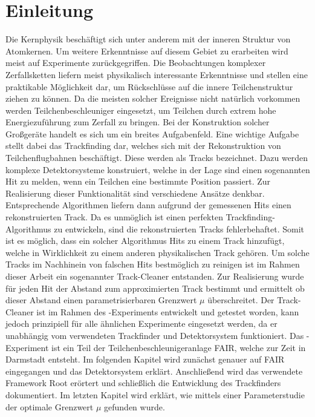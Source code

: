 \chapter{Einleitung}
Die Kernphysik beschäftigt sich unter anderem mit der inneren Struktur von Atomkernen. Um weitere Erkenntnisse auf diesem Gebiet zu erarbeiten wird meist auf Experimente zurückgegriffen. Die Beobachtungen komplexer Zerfallsketten liefern meist physikalisch interessante Erkenntnisse und stellen eine praktikable Möglichkeit dar, um Rückschlüsse auf die innere Teilchenstruktur ziehen zu können. Da die meisten solcher Ereignisse nicht natürlich vorkommen werden Teilchenbeschleuniger eingesetzt, um Teilchen durch extrem hohe Energiezuführung zum Zerfall zu bringen. Bei der Konstruktion solcher Großgeräte handelt es sich um ein breites Aufgabenfeld. Eine wichtige Aufgabe stellt dabei das Trackfinding dar, welches sich mit der Rekonstruktion von Teilchenflugbahnen beschäftigt. Diese werden als Tracks bezeichnet. Dazu werden komplexe Detektorsysteme konstruiert, welche in der Lage sind einen sogenannten Hit zu melden, wenn ein Teilchen eine bestimmte Position passiert. Zur Realisierung dieser Funktionalität sind verschiedene Ansätze denkbar. Entsprechende Algorithmen liefern dann aufgrund der gemessenen Hits einen rekonstruierten Track. Da es unmöglich ist einen perfekten Trackfinding-Algorithmus zu entwickeln, sind die rekonstruierten Tracks fehlerbehaftet.
Somit ist es möglich, dass ein solcher Algorithmus Hits zu einem Track hinzufügt, welche in Wirklichkeit zu einem anderen physikalischen Track gehören. Um solche Tracks im Nachhinein von falschen Hits bestmöglich zu reinigen ist im Rahmen dieser Arbeit ein sogenannter Track-Cleaner entstanden. Zur Realisierung wurde für jeden Hit der Abstand zum approximierten Track bestimmt und ermittelt ob dieser Abstand einen parametrisierbaren Grenzwert $\mu$ überschreitet. Der Track-Cleaner ist im Rahmen des \pnd{}-Experiments entwickelt und getestet worden, kann jedoch prinzipiell für alle ähnlichen Experimente eingesetzt werden, da er unabhängig vom verwendeten Trackfinder und Detektorsystem funktioniert. Das \pnd{}-Experiment ist ein Teil der Teilchenbeschleunigeranlage FAIR, welche zur Zeit in Darmstadt entsteht. Im folgenden Kapitel wird zunächst genauer auf FAIR eingegangen und das Detektorsystem \pnd{} erklärt. Anschließend wird das verwendete Framework Root erörtert und schließlich die Entwicklung des Trackfinders dokumentiert. Im letzten Kapitel wird erklärt, wie mittels einer Parameterstudie der optimale Grenzwert $\mu$ gefunden wurde.